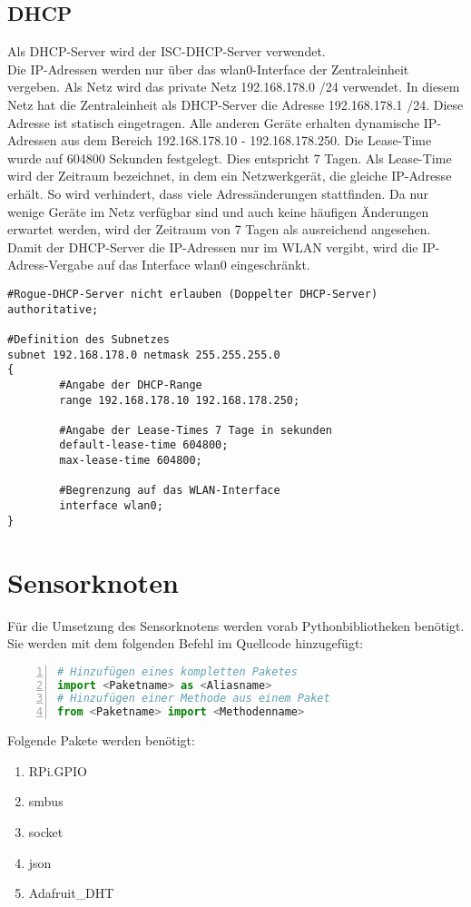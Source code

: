 \subsection{\ac{DHCP}}
 
Als \ac{DHCP}-Server wird der ISC-DHCP-Server verwendet.\\
Die IP-Adressen werden nur über das wlan0-Interface der Zentraleinheit vergeben. Als Netz wird das private Netz 192.168.178.0 /24 verwendet. In diesem Netz hat die Zentraleinheit als \ac{DHCP}-Server die Adresse 192.168.178.1 /24. Diese Adresse ist statisch eingetragen. Alle anderen Geräte erhalten dynamische IP-Adressen aus dem Bereich 192.168.178.10 - 192.168.178.250. Die Lease-Time wurde auf 604800 Sekunden festgelegt. Dies entspricht 7 Tagen. Als Lease-Time wird der Zeitraum bezeichnet, in dem ein Netzwerkgerät, die gleiche IP-Adresse erhält. So wird verhindert, dass viele Adressänderungen stattfinden. Da nur wenige Geräte im Netz verfügbar sind und auch keine häufigen Änderungen erwartet werden, wird der Zeitraum von 7 Tagen als ausreichend angesehen. Damit der \ac{DHCP}-Server die IP-Adressen nur im WLAN vergibt, wird die IP-Adress-Vergabe auf das Interface wlan0 eingeschränkt.



\begin{lstlisting}[caption=Konfiguration des ISC-DHCP-Server,frame=single]
#Rogue-DHCP-Server nicht erlauben (Doppelter DHCP-Server)
authoritative;

#Definition des Subnetzes
subnet 192.168.178.0 netmask 255.255.255.0
{
        #Angabe der DHCP-Range
        range 192.168.178.10 192.168.178.250;

        #Angabe der Lease-Times 7 Tage in sekunden
        default-lease-time 604800;
        max-lease-time 604800;

        #Begrenzung auf das WLAN-Interface
        interface wlan0;
}

\end{lstlisting}

\section{Sensorknoten} %
Für die Umsetzung des Sensorknotens werden vorab Pythonbibliotheken benötigt. Sie werden mit dem folgenden Befehl im Quellcode hinzugefügt:
\begin{lstlisting}[caption=Importbefehl in Python,frame=single,numbers=left,language=Python]
# Hinzufügen eines kompletten Paketes
import <Paketname> as <Aliasname>
# Hinzufügen einer Methode aus einem Paket
from <Paketname> import <Methodenname>
\end{lstlisting}
Folgende Pakete werden benötigt:
\begin{enumerate}
	\item RPi.GPIO
	\item smbus
	\item socket
	\item json
	\item Adafruit\_DHT
\end{enumerate}

